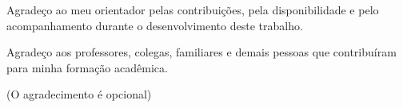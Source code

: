 
\begin{agradecimentostcc}
Agradeço ao meu orientador pelas contribuições, pela disponibilidade e pelo acompanhamento durante o desenvolvimento deste trabalho.

Agradeço aos professores, colegas, familiares e demais pessoas que contribuíram para minha formação acadêmica.

(O agradecimento é opcional)
\end{agradecimentostcc}
